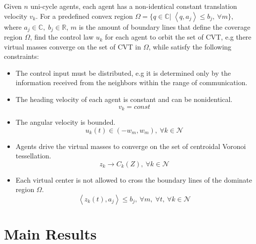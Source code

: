 \documentclass[journal]{IEEEtran}
\newcommand*{\txtspc}[1]{#1\phantom{.}}%
\begin{document}
{	Given ${n}$ uni-cycle agents, each agent has  a non-identical constant translation velocity $v_k$. For a predefined convex region ${\Omega = \{q \in \mathbb{C} \txtspc{|} \left < q, a_j \right >  \leq b_j, ~\forall m \}}$, where ${a_j \in \mathbb{C} \txtspc{,} b_j \in \mathbb{R}}$,  ${m}$ is the amount of boundary lines that define the coverage region ${\Omega}$, find the control law $u_k$ for each agent to orbit the set of CVT, e.g there virtual masses converge on the set of CVT in $\Omega$, while satisfy the following constraints:
	\begin{itemize}
		\item The control input must be distributed, e.g it is determined only by the information received from the neighbors within the range of communication.
		\item The heading velocity of each agent is constant and can be nonidentical. 
		\[v_k = const\]
		\item The angular velocity is bounded.
		\[u_k(t) \in (-w_m,w_m),  ~\forall k \in \mathcal{N}\]
		\item Agents drive the virtual masses to converge on the set of centroidal Voronoi tessellation. 
		\[z_k \rightarrow C_k(Z), ~\forall k \in \mathcal{N}\]
		\item Each virtual center is not allowed to cross the boundary lines of the dominate region ${\Omega}$.
		\[\left < z_k(t), a_j \right >  \leq b_j,~\forall m \txtspc{,} \forall t,  ~\forall k \in \mathcal{N}\]
	\end{itemize}
	
	
	
	}
	\section{Main Results} \label{section:main}
\end{document}
